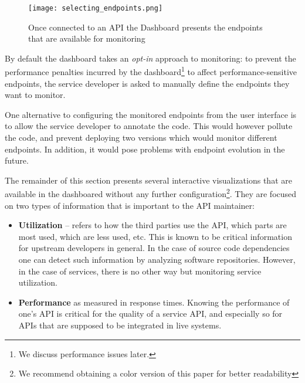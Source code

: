     \begin{figure}[h]
      \centering
      \texttt{[image: selecting\_endpoints.png]}
      \caption{Once connected to an API the Dashboard presents the endpoints that are available for monitoring}
      \label{fig:sep}
    \end{figure}

  By default the dashboard takes an {\em opt-in} approach to monitoring: to prevent the performance penalties incurred by the dashboard\footnote{We discuss performance issues later.} to affect performance-sensitive endpoints, the service developer is asked to manually define the endpoints they want to monitor. 
   

  One alternative to configuring the monitored endpoints from the user interface is to allow the service developer to annotate the code. This would however pollute the code, and prevent deploying two versions which would monitor different endpoints. In addition, it would pose problems with endpoint evolution in the future.

  
\niceseparator

  The remainder of this section presents several interactive
  visualizations that are available in the dashboared without any further configuration\footnote{We recommend obtaining a color version of this paper for better readability}. They are focused on two types of information that is important to the API maintainer: 

  \begin{itemize}

    \item {\bf Utilization} -- refers to how the third parties use the API, which parts are most used, which are less used, etc. This is known to be critical information for upstream developers in general\cite{Haen14a}. In the case of source code dependencies one can detect such information by analyzing software repositories. However, in the case of services, there is no other way but monitoring service utilization. 

    \item {\bf Performance} as measured in response times. Knowing the performance of one's API is critical for the quality of a service API, and especially so for APIs that are supposed to be integrated in live systems. 



  \end{itemize}
